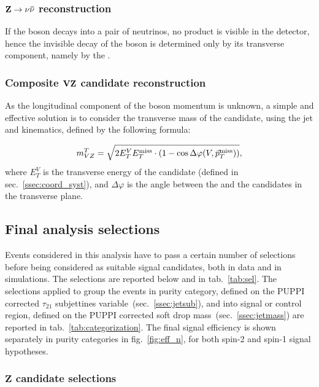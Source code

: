 \subsubsection{$\mathbf{Z \rightarrow \nu \bar{\nu} }$ reconstruction}
\label{ssec:Zcand}

If the \Z boson decays into a pair of neutrinos, no product is visible in the detector, hence the invisible decay of the \Z boson is determined only by its transverse component, namely by the \MET.

\subsubsection{Composite $\mathbf{VZ}$ candidate reconstruction}
\label{ssec:VZcand}

As the longitudinal component of the \Z boson momentum is unknown, a simple and effective solution is to consider the transverse mass of the \VZ candidate, using the jet and \met kinematics, defined by the following formula:

\begin{equation}
m_{VZ}^T = \sqrt{ 2 E_T^V E_T^{\text{miss}} \cdot (1 - \cos \Delta \varphi(V,\vec{p}_T^{\text{miss}})) },
\end{equation}
where $E_T^{V}$ is the transverse energy of the \V candidate (defined in sec.~\ref{ssec:coord_syst}), and $\Delta \varphi$ is the angle between the \V and the \Z candidates in the transverse plane.

\subsection{Final analysis selections}
\label{sec:selections}

Events considered in this analysis have to pass a certain number of selections before being considered as suitable signal candidates, both in data and in simulations. The selections are reported below and in tab.~\ref{tab:sel}. The selections applied to group the events in purity category, defined on the PUPPI corrected $\tau_{21}$ subjettines variable~(sec.~\ref{ssec:jetsub}), and into signal or control region, defined on the PUPPI corrected soft drop mass~(sec.~\ref{ssec:jetmass}) are reported in tab.~\ref{tab:categorization}. The final signal efficiency is shown separately in purity categories in fig.~\ref{fig:eff_n}, for both spin-2 and spin-1 signal hypotheses.

\subsubsection{$\mathbf{Z}$ candidate selections}

